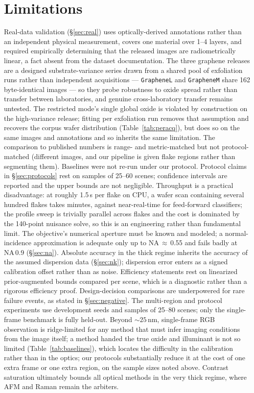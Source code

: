 \documentclass[10pt]{article}
\begin{document}
\section{Limitations}\label{sec:limitations-note}
Real-data validation (\S\ref{sec:real}) uses optically-derived annotations rather than an independent physical measurement, covers one material over 1--4 layers, and required empirically determining that the released images are radiometrically linear, a fact absent from the dataset documentation. The three graphene releases are a designed substrate-variance series drawn from a shared pool of exfoliation runs rather than independent acquisitions --- \texttt{GrapheneL} and \texttt{GrapheneM} share 162 byte-identical images --- so they probe robustness to oxide spread rather than transfer between laboratories, and genuine cross-laboratory transfer remains untested. The restricted mode's single global oxide is violated by construction on the high-variance release; fitting per exfoliation run removes that assumption and recovers the corpus wafer distribution (Table~\ref{tab:peracq}), but does so on the same images and annotations and so inherits the same limitation. The comparison to published numbers is range- and metric-matched but not protocol-matched (different images, and our pipeline is given flake regions rather than segmenting them). Baselines were not re-run under our protocol. Protocol claims in \S\ref{sec:protocols} rest on samples of 25--60 scenes; confidence intervals are reported and the upper bounds are not negligible. Throughput is a practical disadvantage: at roughly 1.5\,s per flake on CPU, a wafer scan containing several hundred flakes takes minutes, against near-real-time for feed-forward classifiers; the profile sweep is trivially parallel across flakes and the cost is dominated by the 140-point nuisance solve, so this is an engineering rather than fundamental limit. The objective's numerical aperture must be known and modeled; a normal-incidence approximation is adequate only up to NA\,$\approx$\,0.55 and fails badly at NA\,0.9 (\S\ref{sec:na}). Absolute accuracy in the thick regime inherits the accuracy of the assumed dispersion data (\S\ref{sec:nk}); dispersion error enters as a signed calibration offset rather than as noise. Efficiency statements rest on linearized prior-augmented bounds compared per scene, which is a diagnostic rather than a rigorous efficiency proof. Design-decision comparisons are underpowered for rare failure events, as stated in \S\ref{sec:negative}. The multi-region and protocol experiments use development seeds and samples of 25--80 scenes; only the single-frame benchmark is fully held-out. Beyond ${\sim}25$\,nm, single-frame RGB observation is ridge-limited for any method that must infer imaging conditions from the image itself; a method handed the true oxide and illuminant is not so limited (Table~\ref{tab:baselines}), which locates the difficulty in the calibration rather than in the optics; our protocols substantially reduce it at the cost of one extra frame or one extra region, on the sample sizes noted above. Contrast saturation ultimately bounds all optical methods in the very thick regime, where AFM and Raman remain the arbiters.
\end{document}
